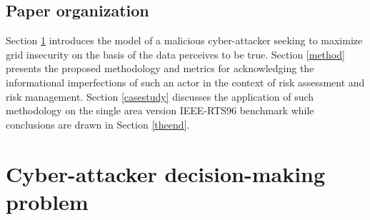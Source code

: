 \documentclass{IEEEtran4PSCC}
\begin{document}
\subsection{Paper organization}

Section \ref{blv} introduces the model of a malicious cyber-attacker seeking to maximize grid insecurity on the basis of the data  perceives to be true. Section \ref{method} presents the proposed methodology and metrics for acknowledging the informational imperfections of such an actor in the context of risk assessment and risk management. Section \ref{casestudy} discusses the application of such methodology on the single area version IEEE-RTS96 benchmark \cite{test_system} while conclusions are drawn in Section \ref{theend}.




 
\section{Cyber-attacker decision-making problem}
\label{blv}
\end{document}
